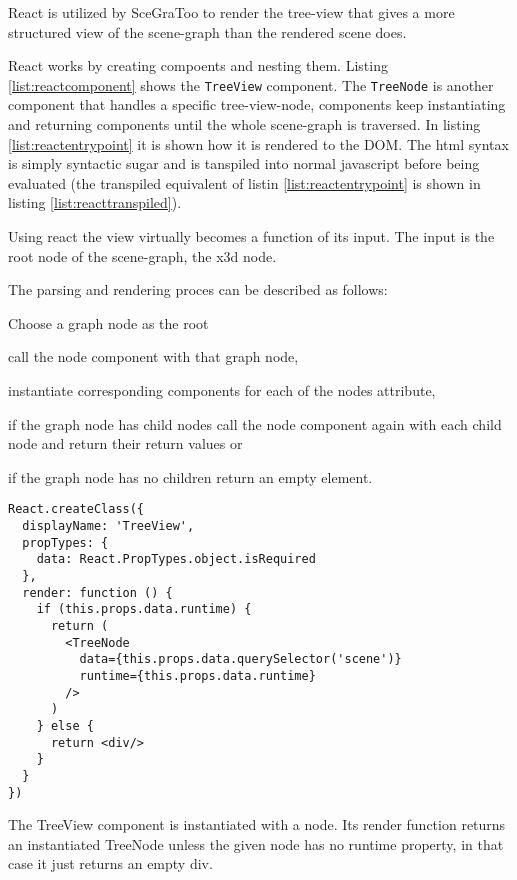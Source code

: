 React is utilized by SceGraToo to render the tree-view that gives a more
structured view of the scene-graph than the rendered scene does.

React works by creating compoents and nesting them. Listing
\ref{list:reactcomponent} shows the \texttt{TreeView} component. The
\texttt{TreeNode} is another component that handles a specific tree-view-node,
components keep instantiating and returning components until the whole
scene-graph is traversed. In listing \ref{list:reactentrypoint} it is shown how
it is rendered to the DOM. The html syntax is simply syntactic sugar and is
tanspiled into normal javascript before being evaluated (the transpiled
equivalent of listin \ref{list:reactentrypoint} is shown in listing
\ref{list:reacttranspiled}).

Using react the view virtually becomes a function of its input. The input is the root node of the scene-graph, the x3d node.

The parsing and rendering proces can be described as follows:
\begin{enumerate*}
  \item Choose a graph node as the root
  \item call the node component with that graph node,
  \item instantiate corresponding components for each of the nodes attribute,
  \item if the graph node has child nodes call the node component again with each child node and return their return values or
  \item if the graph node has no children return an empty element.
\end{enumerate*}

\begin{listing}
  \begin{verbatim}
React.createClass({
  displayName: 'TreeView',
  propTypes: {
    data: React.PropTypes.object.isRequired
  },
  render: function () {
    if (this.props.data.runtime) {
      return (
        <TreeNode
          data={this.props.data.querySelector('scene')}
          runtime={this.props.data.runtime}
        />
      )
    } else {
      return <div/>
    }
  }
})
  \end{verbatim}
  \caption{The TreeView component is instantiated with a node. Its render function returns an instantiated TreeNode unless the given node has no runtime property, in that case it just returns an empty div.}
  \label{list:reactcomponent}
\end{listing}

